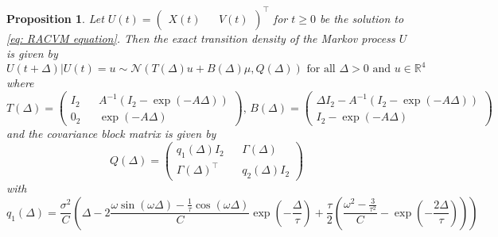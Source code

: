 \documentclass[aoas]{imsart}
\newtheorem{proposition}{Proposition}[section]
\theoremstyle{definition}
\theoremstyle{remark}
\theoremstyle{remark}
\newcommand {\R}{\mathbb{R}}
\newcommand {\1}{\mathbb{1}}
\begin{document}
\begin{proposition}
	Let $U(t)=\begin{pmatrix} X(t) && V(t) \end{pmatrix}^\top$ for $t \geq 0$ be the solution to \eqref{eq: RACVM equation}. Then the exact transition density of the Markov process $U$ is given by 
	\begin{equation}
		U(t+\Delta) \vert U(t)=u \sim \mathcal{N}\left( T(\Delta) u +B(\Delta)\mu, Q(\Delta)\right) \mbox{ for all } \Delta>0 \mbox{ and } u \in \R^4
		\label{eq: X V distribution}
	\end{equation}
	where \begin{equation}
		T(\Delta)=\begin{pmatrix} I_2 && A^{-1}(I_2-\exp(-A\Delta)) \\
			0_2 && \exp(-A\Delta) \end{pmatrix} \mbox{, } B(\Delta)=\begin{pmatrix}
			\Delta I_2 -A^{-1}(I_2-\exp(-A\Delta))\\
			I_2-\exp(-A\Delta)\end{pmatrix}
		\label{eq: link matrices}
	\end{equation}
	and the covariance block matrix is given by
	\begin{equation}
		Q(\Delta)=\begin{pmatrix}
			q_1(\Delta)I_2 && \Gamma(\Delta) \\
			\Gamma(\Delta)^\top && q_2(\Delta)I_2
		\end{pmatrix}
		\label{eq: covariance matrix}
	\end{equation}
	with 
	\begin{equation*}q_1(\Delta)=\frac{\sigma^2}{C}\left( \Delta-2 \frac{\omega \sin(\omega \Delta)-\frac{1}{\tau} \cos(\omega \Delta)}{C} \exp\left( -\frac{\Delta}{\tau} \right) +\frac{\tau}{2} \left( \frac{\omega^2-\frac{3}{\tau^2}}{C}-\exp\left( -\frac{2\Delta}{\tau}\right)\right) \right)
	\end{equation*}
	

\end{proposition}
\end{document}
